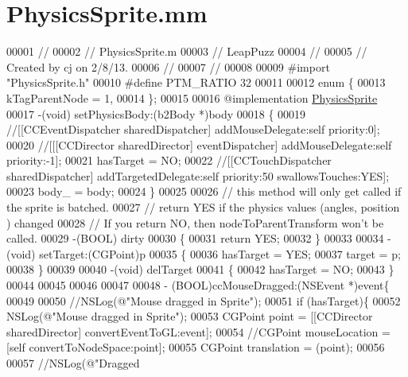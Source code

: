 \hypertarget{_physics_sprite_8mm}{\section{Physics\-Sprite.\-mm}
\label{d6/ded/_physics_sprite_8mm}
}

\begin{DoxyCode}
00001 \textcolor{comment}{//}
00002 \textcolor{comment}{//  PhysicsSprite.m}
00003 \textcolor{comment}{//  LeapPuzz}
00004 \textcolor{comment}{//}
00005 \textcolor{comment}{//  Created by cj on 2/8/13.}
00006 \textcolor{comment}{//}
00007 \textcolor{comment}{//}
00008 
00009 \textcolor{preprocessor}{#import "PhysicsSprite.h"}
00010 \textcolor{preprocessor}{#define PTM\_RATIO 32}
00011 \textcolor{preprocessor}{}
00012 \textcolor{keyword}{enum} \{
00013     kTagParentNode = 1,
00014 \};
00015 
00016 \textcolor{keyword}{@implementation }\hyperlink{interface_physics_sprite}{PhysicsSprite}
00017 -(void) setPhysicsBody:(b2Body *)body
00018 \{
00019     \textcolor{comment}{//[[CCEventDispatcher sharedDispatcher] addMouseDelegate:self priority:0];}
00020     \textcolor{comment}{//[[[CCDirector sharedDirector] eventDispatcher] addMouseDelegate:self priority:-1];}
00021     hasTarget = NO;
00022     \textcolor{comment}{//[[CCTouchDispatcher sharedDispatcher] addTargetedDelegate:self priority:50 swallowsTouches:YES];}
00023     body\_ = body;
00024 \}
00025 
00026 \textcolor{comment}{// this method will only get called if the sprite is batched.}
00027 \textcolor{comment}{// return YES if the physics values (angles, position ) changed}
00028 \textcolor{comment}{// If you return NO, then nodeToParentTransform won't be called.}
00029 -(BOOL) dirty
00030 \{
00031     \textcolor{keywordflow}{return} YES;
00032 \}
00033 
00034 -(void) setTarget:(CGPoint)p
00035 \{
00036     hasTarget = YES;
00037     target = p;
00038 \}
00039 
00040 -(void) delTarget
00041 \{
00042     hasTarget = NO;
00043 \}
00044 
00045 
00046 
00047 
00048 - (BOOL)ccMouseDragged:(NSEvent *)event\{
00049     
00050     \textcolor{comment}{//NSLog(@"Mouse dragged in Sprite");}
00051     \textcolor{keywordflow}{if} (hasTarget)\{
00052         NSLog(\textcolor{stringliteral}{@"Mouse dragged in Sprite"});
00053         CGPoint point = [[CCDirector sharedDirector] convertEventToGL:event];
00054         \textcolor{comment}{//CGPoint mouseLocation = [self convertToNodeSpace:point];}
00055         CGPoint translation = (point);
00056         
00057         \textcolor{comment}{//NSLog(@"Dragged %
}
\end{DoxyCode}
